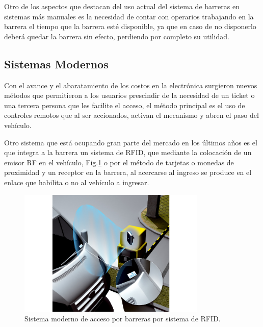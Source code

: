 Otro de los aspectos que destacan del uso actual del sistema de barreras en sistemas más manuales es la necesidad de
contar con  operarios trabajando en la barrera el tiempo que la barrera esté disponible, ya que en caso de no disponerlo
deberá quedar la barrera sin efecto, perdiendo por completo su utilidad.

\subsection{Sistemas Modernos}

Con el avance y el abaratamiento de los costos en la electrónica surgieron nuevos métodos que permitieron a los usuarios
prescindir de la necesidad de un ticket o una tercera persona que les facilite el acceso, el método principal es el uso
de controles remotos que al ser accionados, activan el mecanismo y abren el paso del vehículo.
 
Otro sistema que está ocupando gran parte del mercado en los últimos años es el que integra a la barrera un sistema de
RFID, que mediante la colocación de un emisor RF en el vehículo, Fig.\ref{fig:sistema-moderno} o por el método de tarjetas o monedas de proximidad y un
receptor en la barrera, al acercarse al ingreso se produce en el enlace que habilita o no al vehículo a ingresar.

\begin{figure}
    \centering
    \includegraphics[width=0.8\textwidth]{imgs/sistema-control-acceso-barreras-rfid.jpg}
    \caption{Sistema moderno de acceso por barreras por sistema de RFID.}
    \label{fig:sistema-moderno}
\end{figure}


